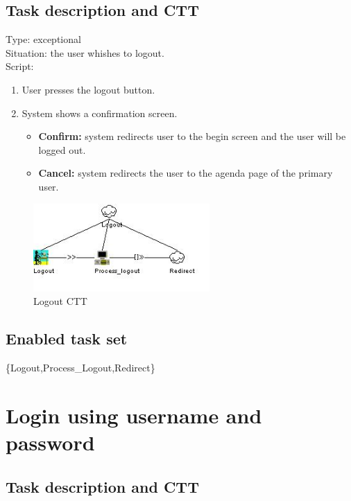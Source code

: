 \documentclass[11pt, a4paper,svglistings]{report}
\begin{document}
\subsection{Task description and CTT}

Type: exceptional \\
Situation: the user whishes to logout. \\
Script:
\begin{enumerate}
\item User presses the logout button.
\item System shows a confirmation screen.
\begin{itemize}
\item \textbf{Confirm:} system redirects user to the begin screen and the user will be logged out.
\item \textbf{Cancel:} system redirects the user to the agenda page of the primary user.
\end{itemize}
\end{enumerate}

\begin{figure}[H]
\centering
    \includegraphics[width=0.6\textwidth]{Logout.jpg}
  \caption[Logout CTT]{\label{fig:Logout}Logout CTT}
\end{figure}

\subsection{Enabled task set}

\{Logout,Process\_Logout,Redirect\}

\section{\label{subsec:loginPass}Login using username and password}

\subsection{Task description and CTT}
\end{document}
